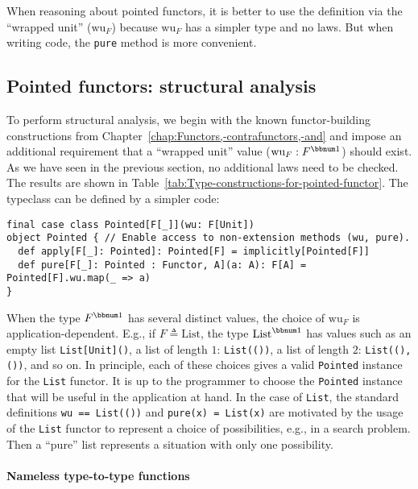 When reasoning about pointed functors, it is better to use the definition
via the \textsf{``}wrapped unit\textsf{''} ($\text{wu}_{F}$) because $\text{wu}_{F}$
has a simpler type and no laws. But when writing code, the \lstinline!pure!
method is more convenient.

\subsection{Pointed functors: structural analysis\label{subsec:Pointed-functors:-structural-analysis}}

To perform structural analysis, we begin with the known functor-building
constructions from Chapter~\ref{chap:Functors,-contrafunctors,-and}
and impose an additional requirement that a \textsf{``}wrapped unit\textsf{''} value
($\text{wu}_{F}:F^{\bbnum 1}$) should exist. As we have seen in the
previous section, no additional laws need to be checked. The results
are shown in Table~\ref{tab:Type-constructions-for-pointed-functor}.
The typeclass can be defined by a simpler code:
\begin{lstlisting}
final case class Pointed[F[_]](wu: F[Unit])
object Pointed { // Enable access to non-extension methods (wu, pure).
  def apply[F[_]: Pointed]: Pointed[F] = implicitly[Pointed[F]]
  def pure[F[_]: Pointed : Functor, A](a: A): F[A] = Pointed[F].wu.map(_ => a)
}
\end{lstlisting}

When the type $F^{\bbnum 1}$ has several distinct values, the choice
of $\text{wu}_{F}$ is application-dependent. E.g., if $F\triangleq\text{List}$,
the type $\text{List}^{\bbnum 1}$ has values such as an empty list
\lstinline!List[Unit]()!, a list of length $1$: \lstinline!List(())!,
a list of length $2$: \lstinline!List((), ())!, and so on. In principle,
each of these choices gives a valid \lstinline!Pointed! instance
for the \lstinline!List! functor. It is up to the programmer to choose
the \lstinline!Pointed! instance that will be useful in the application
at hand. In the case of \lstinline!List!, the standard definitions
\lstinline!wu == List(())! and \lstinline!pure(x) = List(x)! are
motivated by the usage of the \lstinline!List! functor to represent
a choice of possibilities, e.g., in a search problem. Then a \textsf{``}pure\textsf{''}
list represents a situation with only one possibility.

\paragraph{Nameless type-to-type functions}

